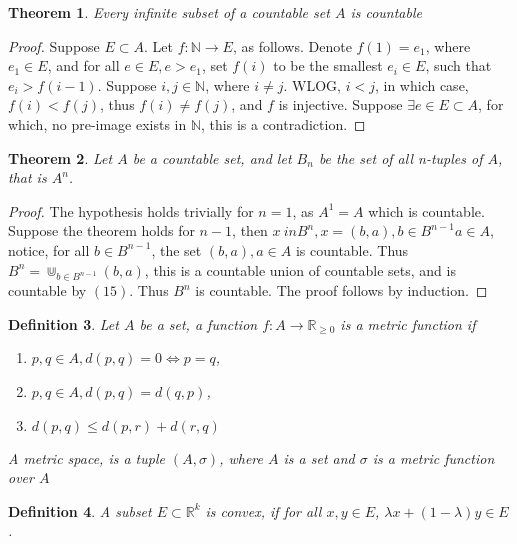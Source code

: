 \documentclass{amsart}
\numberwithin{equation}{section}
\theoremstyle{plain}
\newtheorem{thm}{Theorem}[section]
\newtheorem{dfn}[thm]{Definition}
\theoremstyle{definition}
\begin{document}
\begin{thm}
  Every infinite subset of a countable set $A$ is countable
\end{thm}
\begin{proof}
  Suppose $E \subset A$. Let $f: \mathbb{N} \rightarrow E$, as follows. Denote $f(1) = e_1$, where $e_1 \in E$, and
  for all $e \in E, e > e_1$, set $f(i)$ to be the smallest $e_i \in E$, such that $e_i > f(i - 1)$. Suppose $i, j \in \mathbb{N}$, where $i \not= j$. 
  WLOG, $i < j$, in which case, $f(i) < f(j)$, thus $f(i) \not= f(j)$, and $f$ is injective. Suppose $\exists e \in E \subset A$, for which, no pre-image exists
  in $\mathbb{N}$, this is a contradiction.
\end{proof}

\begin{thm}
  Let $A$ be a countable set, and let $B_n$ be the set of all n-tuples of $A$, that is $A^n$.
\end{thm} 
\begin{proof}
  The hypothesis holds trivially for $n = 1$, as $A^1 = A$ which is countable. Suppose the theorem
  holds for $n -1$, then $x \ in B^n, x = (b,a), b \in B^{n-1} a \in A$, notice, for all $b \in B^{n-1}$, 
  the set $(b,a), a \in A$ is countable. Thus $B^n = \Cup_{b \in B^{n-1}} (b, a)$, this is a countable union
  of countable sets, and is countable by $(15)$. Thus $B^n$ is countable. The proof follows by induction.
\end{proof}

\begin{dfn}
  Let $A$ be a set, a function $f: A \rightarrow \mathbb{R}_{\geq 0}$ is a metric function if 
  \begin{enumerate}
    \item[1] $p,q \in A, d(p,q) = 0 \iff p = q$,\\
    \item[2] $p,q \in A, d(p,q) = d(q,p)$,\\ 
    \item[3] $d(p,q) \leq d(p,r) + d(r,q)$\\
  \end{enumerate}
  A metric space, is a tuple $(A, \sigma)$, where $A$ is a set and $\sigma$ is a metric function over $A$
\end{dfn}

\begin{dfn}
  A subset $E \subset \mathbb{R}^k$ is convex, if for all $x, y \in E$, $\lambda x + (1-\lambda)y \in E$.
\end{dfn}
\end{document}
